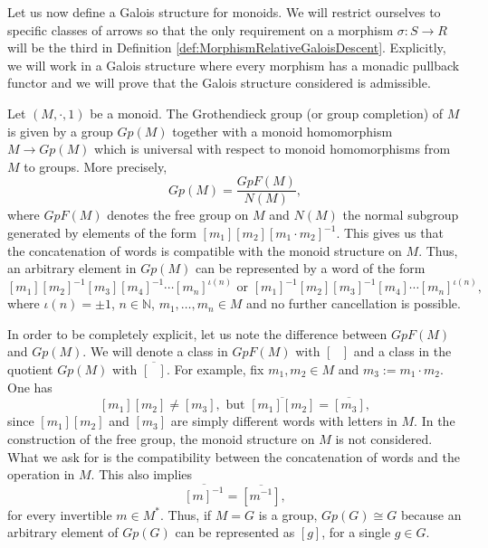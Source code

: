 Let us now define a Galois structure for monoids. We will restrict ourselves to specific classes of arrows so that the only requirement on a morphism $\sigma:S\to R$ will be the third in Definition \ref{def:MorphismRelativeGaloisDescent}. Explicitly, we will work in a Galois structure where every morphism has a monadic pullback functor and we will prove that the Galois structure considered is admissible. 
\begin{definition}
    Let $(M,\cdot, 1)$ be a monoid. The Grothendieck group (or group completion) of $M$ is given by a group $Gp(M)$ together with a monoid homomorphism $M\to Gp(M)$ which is universal with respect to monoid homomorphisms from $M$ to groups. More precisely,
    \[ Gp(M)=\frac{GpF(M)}{N(M)}, \]
    where $GpF(M)$ denotes the free group on $M$ and $N(M)$ the normal subgroup generated by elements of the form $[m_1][m_2][m_1\cdot m_2]^{-1}$. This gives us that the concatenation of words is compatible with the monoid structure on $M$. Thus, an arbitrary element in $Gp(M)$ can be represented by a word of the form
    \[ [m_1][m_2]^{-1}[m_3][m_4]^{-1}\cdots[m_n]^{\iota(n)}\text{ or } [m_1]^{-1}[m_2][m_3]^{-1}[m_4]\cdots[m_n]^{\iota(n)}, \]
    where $\iota(n)=\pm1$, $n\in \mathbb{N}$, $m_1,\dots,m_n\in M$ and no further cancellation is possible. 
\end{definition}
\begin{oss*}
    In order to be completely explicit, let us note the difference between $GpF(M)$ and $Gp(M)$. We will denote a class in $GpF(M)$ with $[\text{ }]$ and a class in the quotient $Gp(M)$ with $\overline{[\text{ }]}$. For example, fix $m_1,m_2\in M$ and $m_3:=m_1\cdot m_2$. One has
    \[ [m_1][m_2] \not= [m_3],\text{ but }\overline{[m_1][m_2]} = \overline{[m_3]}, \]
    since $[m_1][m_2]$ and $[m_3]$ are simply different words with letters in $M$. In the construction of the free group, the monoid structure on $M$ is not considered. What we ask for is the compatibility between the concatenation of words and the operation in $M$. This also implies
    \[ \overline{[m]^{-1}} = \overline{[m^{-1}]}, \]
    for every invertible $m\in M^*$. Thus, if $M=G$ is a group, $Gp(G)\cong G$ because an arbitrary element of $Gp(G)$ can be represented as $[g]$, for a single $g\in G$.
\end{oss*}
